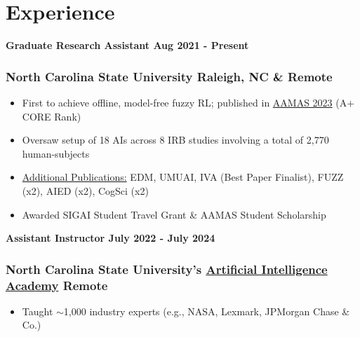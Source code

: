 \section{Experience}
\vspace{-8pt}

\noindent\textbf{Graduate Research Assistant \hfill Aug 2021 - Present}
\subsubsection{North Carolina State University \hfill  Raleigh, NC \& Remote}
\vspace{-2pt}
\begin{itemize}
\setlength\itemsep{-0.5em}
	\item First to achieve offline, model-free fuzzy RL; published in \href{https://dl.acm.org/doi/10.5555/3545946.3598770}{AAMAS 2023} (A+ CORE Rank)
     \item Oversaw setup of 18 AIs across 8 IRB studies involving a total of 2,770 human-subjects
    \item \href{https://scholar.google.com/citations?user=lJkPFpwAAAAJ&hl=en}{Additional Publications:} EDM, UMUAI, IVA {\footnotesize (Best Paper Finalist)}, FUZZ {\footnotesize (x2)}, AIED {\footnotesize (x2)}, CogSci {\footnotesize (x2)}
    \item Awarded SIGAI Student Travel Grant \& AAMAS Student Scholarship 
\end{itemize}

\vspace{-4pt}

\noindent\textbf{Assistant Instructor \hfill July 2022 - July 2024}
\subsubsection{North Carolina State University's \href{https://ai-academy.ncsu.edu/}{Artificial Intelligence Academy} \hfill Remote}
\vspace{-2pt}
\begin{itemize}
	\item Taught $\sim$1,000 industry experts (e.g., NASA, Lexmark, JPMorgan Chase \& Co.)
\end{itemize}

